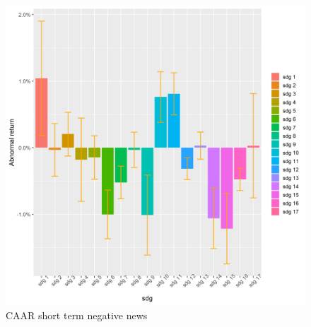 \begin{figure} [H]
    \centering
    \includegraphics[scale=0.6]{Projekt/1.Figures analysis/ST_negative_sdg_bar.png}
    \caption{CAAR short term negative news}
    \label{fig:ST_pos_news}
\end{figure}




